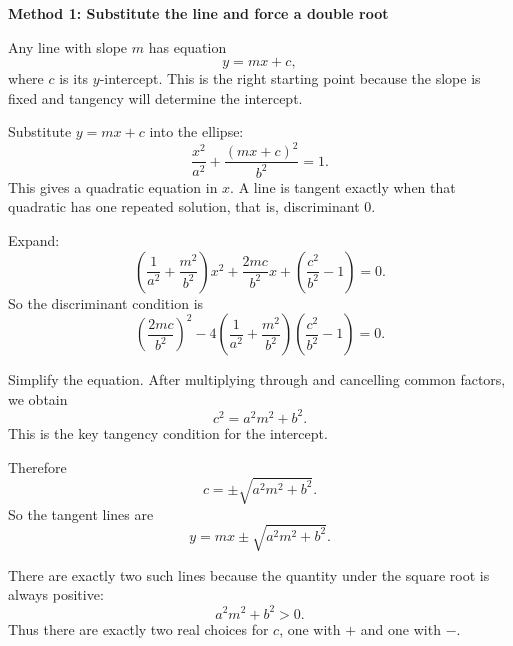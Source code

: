 \documentclass[a4paper,12pt,twocolumn]{article}
\newenvironment{solutionbox}{\begin{framed}}{\end{framed}}
\begin{document}
\begin{solutionbox}
\textbf{Method 1: Substitute the line and force a double root}

\begin{steps}
\item Any line with slope \(m\) has equation
\[
y=mx+c,
\]
where \(c\) is its \(y\)-intercept. This is the right starting point because the slope is fixed and tangency will determine the intercept.

\item Substitute \(y=mx+c\) into the ellipse:
\[
\frac{x^2}{a^2}+\frac{(mx+c)^2}{b^2}=1.
\]
This gives a quadratic equation in \(x\). A line is tangent exactly when that quadratic has one repeated solution, that is, discriminant \(0\).

\item Expand:
\[
\left(\frac1{a^2}+\frac{m^2}{b^2}\right)x^2+\frac{2mc}{b^2}x+\left(\frac{c^2}{b^2}-1\right)=0.
\]
So the discriminant condition is
\[
\left(\frac{2mc}{b^2}\right)^2
-4\left(\frac1{a^2}+\frac{m^2}{b^2}\right)\left(\frac{c^2}{b^2}-1\right)=0.
\]

\item Simplify the equation. After multiplying through and cancelling common factors, we obtain
\[
c^2=a^2m^2+b^2.
\]
This is the key tangency condition for the intercept.

\item Therefore
\[
c=\pm\sqrt{a^2m^2+b^2}.
\]
So the tangent lines are
\[
\boxed{y=mx\pm\sqrt{a^2m^2+b^2}.}
\]

\item There are exactly two such lines because the quantity under the square root is always positive:
\[
a^2m^2+b^2>0.
\]
Thus there are exactly two real choices for \(c\), one with \(+\) and one with \(-\).
\end{steps}
\end{solutionbox}
\end{document}
